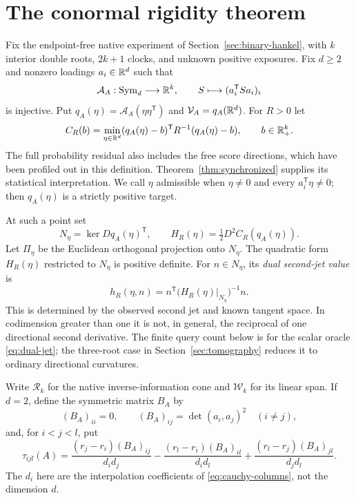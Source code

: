 \section{The conormal rigidity theorem}\label{sec:general-tomography}
Fix the endpoint-free native experiment of Section~\ref{sec:binary-hankel}, with $k$ interior double roots, $2k+1$ clocks, and unknown positive exposures. Fix $d\ge2$ and nonzero loadings $a_i\in\mathbb R^d$ such that
\[
 \mathcal A_A:\operatorname{Sym}_d\longrightarrow\mathbb R^k,\qquad
 S\longmapsto(a_i^{\mathsf T}Sa_i)_i
\]
is injective. Put $q_A(\eta)=\mathcal A_A(\eta\eta^{\mathsf T})$ and
$\mathcal V_A=q_A(\mathbb R^d)$. For $R>0$ let
\[
 C_R(b)=\min_{\eta\in\mathbb R^d}(q_A(\eta)-b)^{\mathsf T}R^{-1}(q_A(\eta)-b),
 \qquad b\in\mathbb R_+^k.
\]
The full probability residual also includes the free score directions, which have been profiled out in this definition. Theorem~\ref{thm:synchronized} supplies its statistical interpretation. We call $\eta$ admissible when $\eta\ne0$ and every $a_i^{\mathsf T}\eta\ne0$; then $q_A(\eta)$ is a strictly positive target.

At such a point set
\[
 N_\eta=\ker Dq_A(\eta)^{\mathsf T},\qquad
 H_R(\eta)=\tfrac12D^2 C_R(q_A(\eta)).
\]
Let $\Pi_\eta$ be the Euclidean orthogonal projection onto $N_\eta$. The quadratic form $H_R(\eta)$ restricted to $N_\eta$ is positive definite. For $n\in N_\eta$, its \emph{dual second-jet value} is
\begin{equation}\label{eq:dual-jet}
 h_R(\eta,n)=n^{\mathsf T}
       \big(H_R(\eta)|_{N_\eta}\big)^{-1}n.
\end{equation}
This is determined by the observed second jet and known tangent space. In codimension greater than one it is not, in general, the reciprocal of one directional second derivative. The finite query count below is for the scalar oracle \eqref{eq:dual-jet}; the three-root case in Section~\ref{sec:tomography} reduces it to ordinary directional curvatures.

Write $\mathscr R_k$ for the native inverse-information cone and $\mathscr W_k$ for its linear span. If $d=2$, define the symmetric matrix $B_A$ by
\[
 (B_A)_{ii}=0,\qquad (B_A)_{ij}=\det(a_i,a_j)^2\quad(i\ne j),
\]
and, for $i<j<l$, put
\begin{equation}\label{eq:triple-transversality}
 \tau_{ijl}(A)=\frac{(r_j-r_i)(B_A)_{ij}}{d_i d_j}
 -\frac{(r_l-r_i)(B_A)_{il}}{d_i d_l}
 +\frac{(r_l-r_j)(B_A)_{jl}}{d_j d_l}.
\end{equation}
The $d_i$ here are the interpolation coefficients of \eqref{eq:cauchy-columns}, not the dimension $d$.

